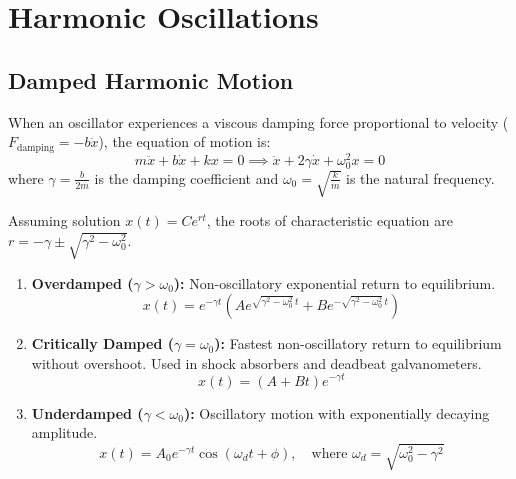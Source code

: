 \documentclass[12pt,a4paper]{article}
\begin{document}
\section{Harmonic Oscillations}

\subsection{Damped Harmonic Motion}

When an oscillator experiences a viscous damping force proportional to velocity ($F_{\text{damping}} = -b \dot{x}$), the equation of motion is:
\begin{equation}
m \ddot{x} + b \dot{x} + k x = 0 \implies \ddot{x} + 2\gamma \dot{x} + \omega_0^2 x = 0
\end{equation}
where $\gamma = \frac{b}{2m}$ is the damping coefficient and $\omega_0 = \sqrt{\frac{k}{m}}$ is the natural frequency.

Assuming solution $x(t) = C e^{r t}$, the roots of characteristic equation are $r = -\gamma \pm \sqrt{\gamma^2 - \omega_0^2}$.

\begin{tcolorbox}[formulabox, title={\textbf{Three Cases of Damped Motion}}]
\begin{enumerate}[leftmargin=*, itemsep=4pt]
  \item \textbf{Overdamped ($\gamma > \omega_0$):} Non-oscillatory exponential return to equilibrium.
  \begin{equation}
  x(t) = e^{-\gamma t} \left( A e^{\sqrt{\gamma^2 - \omega_0^2}\,t} + B e^{-\sqrt{\gamma^2 - \omega_0^2}\,t} \right)
  \end{equation}
  \item \textbf{Critically Damped ($\gamma = \omega_0$):} Fastest non-oscillatory return to equilibrium without overshoot. Used in shock absorbers and deadbeat galvanometers.
  \begin{equation}
  x(t) = (A + B t) e^{-\gamma t}
  \end{equation}
  \item \textbf{Underdamped ($\gamma < \omega_0$):} Oscillatory motion with exponentially decaying amplitude.
  \begin{equation}
  x(t) = A_0 e^{-\gamma t} \cos(\omega_d t + \phi), \quad \text{where } \omega_d = \sqrt{\omega_0^2 - \gamma^2}
  \end{equation}
\end{enumerate}
\end{tcolorbox}
\end{document}
